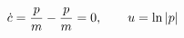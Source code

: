 \documentclass[preview]{standalone}
\begin{document}
\begin{align*}
\special{dvisvgm:raw <g id='unique000'>}\dot c = \frac pm-\frac pm = 0,\qquad u=\ln|p|\special{dvisvgm:raw </g>}
\end{align*}
\end{document}
